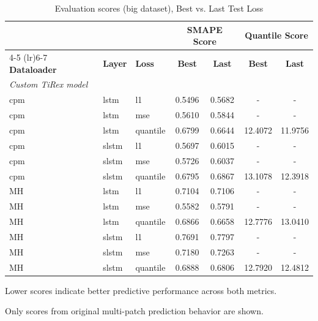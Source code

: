 \documentclass[a4paper,oneside,10pt,ngerman,english]{scrartcl}
\begin{document}
\begin{table}[htbp]
	\centering
	\begin{threeparttable}
		\caption{Evaluation scores (big dataset), Best vs. Last Test Loss}
		\label{tab:scores_custom_tirex_best_last}
		\setlength{\tabcolsep}{3pt}
		\begin{tabular}{lllcccc}
			\toprule
			& & & \multicolumn{2}{c}{\textbf{SMAPE Score}} & \multicolumn{2}{c}{\textbf{Quantile Score}} \\
			\cmidrule(lr){4-5} \cmidrule(lr){6-7}
			\textbf{Dataloader} & \textbf{Layer} & \textbf{Loss} & \textbf{Best} & \textbf{Last} & \textbf{Best} & \textbf{Last} \\
			\midrule
			\multicolumn{7}{l}{{\small \emph{Custom TiRex model}}}\\
			cpm & lstm & l1         & \cellcolor[HTML]{fdfebc}0.5496 & 0.5682 & -  & -  \\
			cpm & lstm & mse        & \cellcolor[HTML]{fdfebc}0.5610 & 0.5844 & -  & -  \\
			cpm & lstm & quantile   & 0.6799 & \cellcolor[HTML]{fdfebc}0.6644 & 12.4072 & \cellcolor[HTML]{fdfebc}11.9756 \\
			\addlinespace
			cpm & slstm & l1        & \cellcolor[HTML]{fdfebc}0.5697 & 0.6015 & -  & -  \\
			cpm & slstm & mse       & \cellcolor[HTML]{fdfebc}0.5726 & 0.6037 & -  & -  \\
			cpm & slstm & quantile  & \cellcolor[HTML]{fdfebc}0.6795 & 0.6867 & 13.1078 & \cellcolor[HTML]{fdfebc}12.3918 \\
			\addlinespace
			MH & lstm & l1       & \cellcolor[HTML]{fdfebc}0.7104 & 0.7106 & - & - \\
			MH & lstm & mse      & \cellcolor[HTML]{fdfebc}0.5582 & 0.5791 & -  & -  \\
			MH & lstm & quantile & 0.6866 & \cellcolor[HTML]{fdfebc}0.6658 & \cellcolor[HTML]{fdfebc}12.7776 & 13.0410 \\
			\addlinespace
			MH & slstm & l1      & \cellcolor[HTML]{fdfebc}0.7691 & 0.7797 & - & - \\
			MH & slstm & mse     & \cellcolor[HTML]{fdfebc}0.7180 & 0.7263 & - & - \\
			MH & slstm & quantile & 0.6888 & \cellcolor[HTML]{fdfebc}0.6806 & 12.7920 & \cellcolor[HTML]{fdfebc}12.4812 \\
			\bottomrule
		\end{tabular}
		\begin{tablenotes}
			\small
			\item[a] Lower scores indicate better predictive performance across both metrics.
			\item[b] Only scores from original multi-patch prediction behavior are shown.
		\end{tablenotes}	
	\end{threeparttable}
\end{table}
\end{document}
